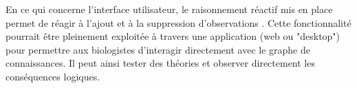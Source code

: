 \begin{refsegment}
En ce qui concerne l'interface utilisateur, le raisonnement réactif mis en place permet de réagir à l'ajout et à la suppression  d'observations . Cette fonctionnalité pourrait être pleinement exploitée à travers une application (web ou "desktop") pour permettre aux biologistes d'interagir directement avec le graphe de connaissances. Il peut ainsi tester des théories et observer directement les conséquences logiques.

\end{refsegment}
